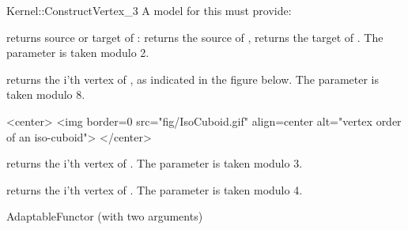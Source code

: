 \begin{ccRefFunctionObjectConcept}{Kernel::ConstructVertex_3}
A model for this must provide:


 {returns source or target of : \ccVar{}
  returns the source of , \ccVar{} returns the target
  of . The parameter  is taken modulo 2. }

 {returns the i'th vertex of
  , as indicated in the figure below. The parameter  is
  taken modulo 8. 
  }

\begin{ccHtmlOnly}
<center>
<img border=0 src="fig/IsoCuboid.gif" align=center 
  alt="vertex order of an iso-cuboid">
</center>
\end{ccHtmlOnly} 

 {returns the i'th vertex of . The parameter
   is taken modulo 3.}

 {returns the i'th vertex of
  . The parameter  is taken modulo 4.}

\ccRefines
AdaptableFunctor (with two arguments)

\ccSeeAlso
{} \\
 \\
  \\
 \\

\end{ccRefFunctionObjectConcept}
